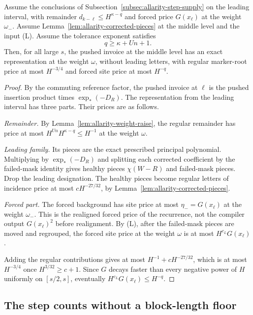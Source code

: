 \begin{proposition}
\label{prop:allarity-launch}
Assume the conclusions of Subsection~\ref{subsec:allarity-step-supply} on
the leading interval, with remainder $d_{k-\ell}\le H^{\kappa-q}$ and
forced price $G(x_\ell)$ at the weight $\omega_-$. Assume
Lemma~\ref{lem:allarity-corrected-pieces} at the middle level and the
input (L). Assume the tolerance exponent satisfies
\[
 q\ge\kappa+Un+1 .
\]
Then, for all large $s$, the pushed invoice at the middle level has an
exact representation at the weight $\omega$, without leading letters, with
regular marker-root price at most $H^{-3/4}$ and forced site price at most
$H^{-q}$.
\end{proposition}
\begin{proof}
By the commuting reference factor, the pushed invoice at $\ell$ is the
pushed insertion product times $\exp_*(-D_R)$. The representation from
the leading interval has three parts. Their prices are as follows.

\emph{Remainder.} By Lemma~\ref{lem:allarity-weight-raise}, the regular
remainder has price at most $H^{Un}H^{\kappa-q}\le H^{-1}$ at the weight
$\omega$.

\emph{Leading family.} Its pieces are the exact prescribed principal
polynomial. Multiplying by $\exp_*(-D_R)$ and splitting each corrected
coefficient by the failed-mask identity gives healthy pieces
$\chi(W-R)$ and failed-mask pieces. Drop the leading designation. The
healthy pieces become regular letters of incidence price at most
$cH^{-27/32}$, by Lemma~\ref{lem:allarity-corrected-pieces}.

\emph{Forced part.} The forced background has site price at most
$\eta_-=G(x_\ell)$ at the weight $\omega_-$. This is the realigned forced
price of the recurrence, not the compiler output $G(x_\ell)^2$ before
realignment. By (L), after the failed-mask pieces are moved and
regrouped, the forced site price at the weight $\omega$ is at most
$H^{c_L}G(x_\ell)$.

Adding the regular contributions gives at most $H^{-1}+cH^{-27/32}$, which
is at most $H^{-3/4}$ once $H^{3/32}\ge c+1$. Since $G$ decays faster than
every negative power of $H$ uniformly on $[s/2,s]$, eventually
$H^{c_L}G(x_\ell)\le H^{-q}$.
\end{proof}

\subsection{The step counts without a block-length floor}
\label{subsec:allarity-lower-count}

